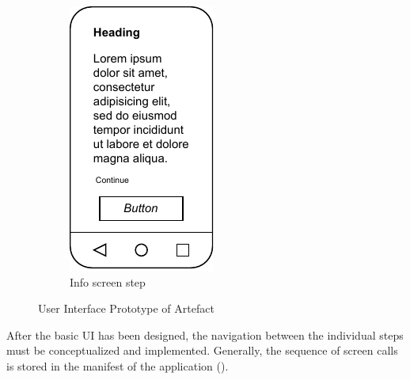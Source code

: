 \begin{figure}[htbp]
\begin{subfigure}[b]{0.3\textwidth}
        \includegraphics[width=\textwidth]{content/05_design_and_dev_artefacts/ActivityInfoScreen.drawio.pdf}
        \caption{Info screen step}
        \label{subfig:InfoScreen}
    \end{subfigure}
       \caption{User Interface Prototype of Artefact}
       \label{fig:uiPrototypeArtefact}
\end{figure}

After the basic UI has been designed, the navigation between the individual steps must be conceptualized and implemented. Generally, the sequence of screen calls is stored in the manifest of the application (\cite{Google.2023}).

